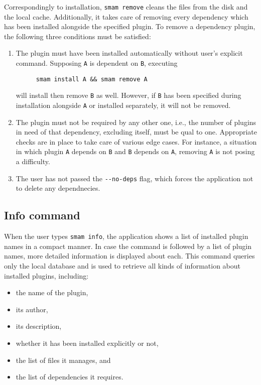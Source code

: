 Correspondingly to installation, \verb|smam remove| cleans the files from the disk and the local cache.
Additionally, it takes care of removing every dependency which has been installed alongside the specified plugin.
To remove a dependency plugin, the following three conditions must be satisfied:
\begin{enumerate}
\item
The plugin must have been installed automatically without user's explicit command.
Supposing \verb|A| is dependent on \verb|B|, executing

\begin{figure}[htp]
\centering
\verb|smam install A && smam remove A|
\end{figure}

will install then remove \verb|B| as well.
However, if \verb|B| has been specified during installation alongside \verb|A| or installed separately, it will not be removed.

\item
The plugin must not be required by any other one, i.e., the number of plugins in need of that dependency, excluding itself, must be qual to one.
Appropriate checks are in place to take care of various edge cases.
For instance, a situation in which plugin \verb|A| depends on \verb|B| and \verb|B| depends on \verb|A|, removing \verb|A| is not posing a difficulty.

\item
The user has not passed the \verb|--no-deps| flag, which forces the application not to delete any dependnecies.

\end{enumerate}

\subsection{Info command}

When the user types \verb|smam info|, the application shows a list of installed plugin names in a compact manner.
In case the command is followed by a list of plugin names, more detailed information is displayed about each.
This command queries only the local database and is used to retrieve all kinds of information about installed plugins, including:

\begin{itemize}
    \item the name of the plugin,
    \item its author,
    \item its description,
    \item whether it has been installed explicitly or not,
    \item the list of files it manages, and
    \item the list of dependencies it requires.
\end{itemize}

